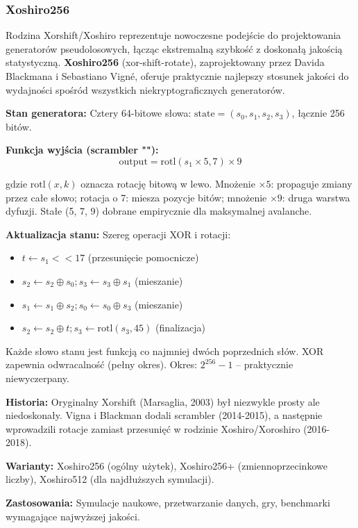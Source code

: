 \documentclass[12pt,a4paper]{article}
\begin{document}
\subsubsection{Xoshiro256}

Rodzina Xorshift/Xoshiro reprezentuje nowoczesne podejście do projektowania generatorów pseudolosowych, łącząc ekstremalną szybkość z doskonałą jakością statystyczną. \textbf{Xoshiro256\*\*} (xor-shift-rotate), zaprojektowany przez Davida Blackmana i Sebastiano Vigné, oferuje praktycznie najlepszy stosunek jakości do wydajności spośród wszystkich niekryptograficznych generatorów.

\textbf{Stan generatora:} Cztery 64-bitowe słowa: $\text{state} = (s_0, s_1, s_2, s_3)$, łącznie 256 bitów.

\textbf{Funkcja wyjścia (scrambler "\*\*"):}
$$\text{output} = \text{rotl}(s_1 \times 5, 7) \times 9$$

gdzie $\text{rotl}(x, k)$ oznacza rotację bitową w lewo. Mnożenie $\times 5$: propaguje zmiany przez całe słowo; rotacja o 7: miesza pozycje bitów; mnożenie $\times 9$: druga warstwa dyfuzji. Stałe (5, 7, 9) dobrane empirycznie dla maksymalnej avalanche.

\textbf{Aktualizacja stanu:} Szereg operacji XOR i rotacji:
\begin{itemize}
    \item $t \leftarrow s_1 << 17$ (przesunięcie pomocnicze)
    \item $s_2 \leftarrow s_2 \oplus s_0; s_3 \leftarrow s_3 \oplus s_1$ (mieszanie)
    \item $s_1 \leftarrow s_1 \oplus s_2; s_0 \leftarrow s_0 \oplus s_3$ (mieszanie)
    \item $s_2 \leftarrow s_2 \oplus t; s_3 \leftarrow \text{rotl}(s_3, 45)$ (finalizacja)
\end{itemize}

Każde słowo stanu jest funkcją co najmniej dwóch poprzednich słów. XOR zapewnia odwracalność (pełny okres). Okres: $2^{256} - 1$ – praktycznie niewyczerpany.

\textbf{Historia:} Oryginalny Xorshift (Marsaglia, 2003) był niezwykle prosty ale niedoskonały. Vigna i Blackman dodali scrambler (2014-2015), a następnie wprowadzili rotacje zamiast przesunięć w rodzinie Xoshiro/Xoroshiro (2016-2018).

\textbf{Warianty:} Xoshiro256\*\* (ogólny użytek), Xoshiro256+ (zmiennoprzecinkowe liczby), Xoshiro512\*\* (dla najdłuższych symulacji).

\textbf{Zastosowania:} Symulacje naukowe, przetwarzanie danych, gry, benchmarki wymagające najwyższej jakości.
\end{document}
